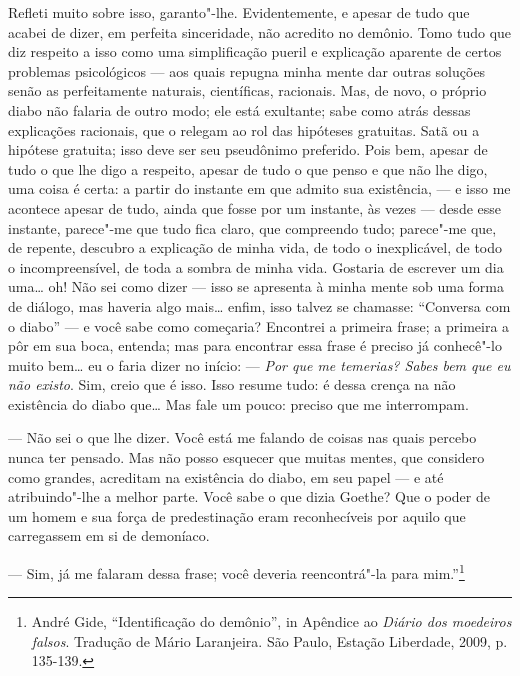 Refleti muito sobre isso, garanto"-lhe. Evidentemente, e apesar de tudo
que acabei de dizer, em perfeita sinceridade, não acredito no demônio.
Tomo tudo que diz respeito a isso como uma simplificação pueril e
explicação aparente de certos problemas psicológicos --- aos quais
repugna minha mente dar outras soluções senão as perfeitamente naturais,
científicas, racionais. Mas, de novo, o próprio diabo não falaria de
outro modo; ele está exultante; sabe como atrás dessas explicações
racionais, que o relegam ao rol das hipóteses gratuitas. Satã ou a
hipótese gratuita; isso deve ser seu pseudônimo preferido. Pois bem,
apesar de tudo o que lhe digo a respeito, apesar de tudo o que penso e
que não lhe digo, uma coisa é certa: a partir do instante em que admito
sua existência, --- e isso me acontece apesar de tudo, ainda que fosse por
um instante, às vezes --- desde esse instante, parece"-me que tudo fica
claro, que compreendo tudo; parece"-me que, de repente, descubro a
explicação de minha vida, de todo o inexplicável, de todo o
incompreensível, de toda a sombra de minha vida. Gostaria de escrever um
dia uma\ldots{} oh! Não sei como dizer --- isso se apresenta à minha mente
sob uma forma de diálogo, mas haveria algo mais\ldots{} enfim, isso talvez
se chamasse: ``Conversa com o diabo'' --- e você sabe como começaria?
Encontrei a primeira frase; a primeira a pôr em sua boca, entenda; mas
para encontrar essa frase é preciso já conhecê"-lo muito bem\ldots{} eu o
faria dizer no início: --- \emph{Por que me temerias? Sabes bem que eu não
existo}. Sim, creio que é isso. Isso resume tudo: é dessa crença na não
existência do diabo que\ldots{} Mas fale um pouco: preciso que me
interrompam.

--- Não sei o que lhe dizer. Você está me falando de coisas nas quais
percebo nunca ter pensado. Mas não posso esquecer que muitas mentes, que
considero como grandes, acreditam na existência do diabo, em seu papel
--- e até atribuindo"-lhe a melhor parte. Você sabe o que dizia Goethe?
Que o poder de um homem e sua força de predestinação eram reconhecíveis
por aquilo que carregassem em si de demoníaco.

--- Sim, já me falaram dessa frase; você deveria reencontrá"-la para
mim.''\footnote{André Gide, ``Identificação do demônio'', in
  Apêndice ao \emph{Diário dos moedeiros falsos}. Tradução de Mário
  Laranjeira. São Paulo, Estação Liberdade, 2009, p. 135-139. \versal{[N. T.]}}

